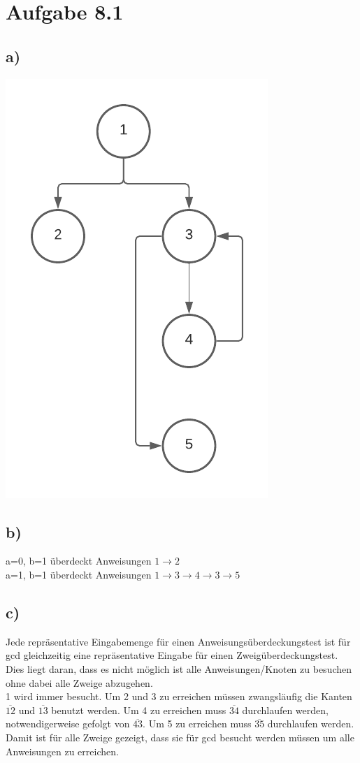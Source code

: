 \documentclass[a4paper,11pt]{scrartcl}
\begin{document}
		
	\section*{Aufgabe 8.1}
	\subsection*{a)}
        \includegraphics[scale=1]{src/08_1a_Controlflow.pdf}
	\subsection*{b)}
	    a=0, b=1 überdeckt Anweisungen $1\rightarrow 2$\\
	    a=1, b=1 überdeckt Anweisungen $1\rightarrow 3 \rightarrow 4 \rightarrow 3 \rightarrow 5$
	\subsection*{c)}
	    Jede repräsentative Eingabemenge für einen Anweisungsüberdeckungstest ist für gcd gleichzeitig eine repräsentative Eingabe für einen Zweigüberdeckungstest. Dies liegt daran, dass es nicht möglich ist alle Anweisungen/Knoten zu besuchen ohne dabei alle Zweige abzugehen. \\
	    1 wird immer besucht. Um 2 und 3 zu erreichen müssen zwangsläufig die Kanten $\overline{12}$ und $\overline{13}$ benutzt werden. Um 4 zu erreichen muss $\overline{34}$ durchlaufen werden, notwendigerweise gefolgt von $\overline{43}$. Um 5 zu erreichen muss $\overline{35}$ durchlaufen werden. Damit ist für alle Zweige gezeigt, dass sie für gcd besucht werden müssen um alle Anweisungen zu erreichen. 
\end{document}
